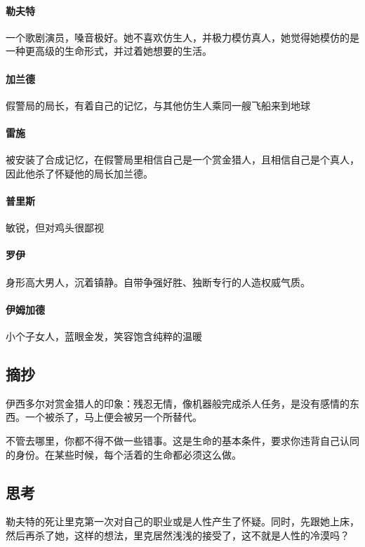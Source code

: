 \documentclass[a4paper]{ctexart}
\begin{document}
		\paragraph{勒夫特}
		一个歌剧演员，嗓音极好。她不喜欢仿生人，并极力模仿真人，她觉得她模仿的是一种更高级的生命形式，并过着她想要的生活。
		
		\paragraph{加兰德}
		假警局的局长，有着自己的记忆，与其他仿生人乘同一艘飞船来到地球
		
		\paragraph{雷施}
		被安装了合成记忆，在假警局里相信自己是一个赏金猎人，且相信自己是个真人，因此他杀了怀疑他的局长加兰德。
		
		\paragraph{普里斯}
		敏锐，但对鸡头很鄙视
		
		\paragraph{罗伊}
		身形高大男人，沉着镇静。自带争强好胜、独断专行的人造权威气质。
		
		\paragraph{伊姆加德}
		小个子女人，蓝眼金发，笑容饱含纯粹的温暖
		
	\subsection{摘抄}
 伊西多尔对赏金猎人的印象：残忍无情，像机器般完成杀人任务，是没有感情的东西。一个被杀了，马上便会被另一个所替代。
	
 不管去哪里，你都不得不做一些错事。这是生命的基本条件，要求你违背自己认同的身份。在某些时候，每个活着的生命都必须这么做。
	
	\subsection{思考}
	勒夫特的死让里克第一次对自己的职业或是人性产生了怀疑。同时，先跟她上床，然后再杀了她，这样的想法，里克居然浅浅的接受了，这不就是人性的冷漠吗？
\end{document}
